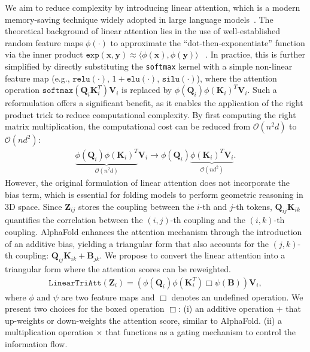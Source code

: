 We aim to reduce complexity by introducing linear attention, which is a modern memory-saving technique widely adopted in large language models~\cite{minimax2025minimax01scalingfoundationmodels,kimiteam2025kimilinearexpressiveefficient}. The theoretical background of linear attention lies in the use of well-established random feature maps $\phi(\cdot)$ to approximate the ``dot-then-exponentiate'' function via the inner product $\mathtt{exp}(\mathbf{x}, \mathbf{y})\approx\langle\phi(\mathbf{x}), \phi(\mathbf{y})\rangle$ ~\cite{rahimi2007random,peng2021randomfeatureattention}. In practice, this is further simplified by directly substituting the \texttt{softmax} kernel with a simple non-linear feature map (e.g., $\mathtt{relu(\cdot)}$, $1+\mathtt{elu(\cdot)}$, $\mathtt{silu}(\cdot)$), where the attention operation $\mathtt{softmax}(\mathbf{Q}_i\mathbf{K}_i^T)\mathbf{V}_i$ is replaced by $\phi(\mathbf{Q}_i)\phi(\mathbf{K}_i)^T\mathbf{V}_i$. Such a reformulation offers a significant benefit, as it enables the application of the right product trick to reduce computational complexity. By first computing the right matrix multiplication, the computational cost can be reduced from $\mathcal{O}(n^2d)$ to  $\mathcal{O}(nd^2)$:
\begin{align}
\underbrace{\phi(\mathbf{Q}_i)\phi(\mathbf{K}_i)^T}_{\mathcal{O}(n^2d)}\mathbf{V}_i
\rightarrow \phi(\mathbf{Q}_i)\underbrace{\phi(\mathbf{K}_i)^T\mathbf{V}_i}_{\mathcal{O}(nd^2)}.
\end{align}
However, the original formulation of linear attention does not incorporate the bias term, which is essential for folding models to perform geometric reasoning in 3D space. Since $\mathbf{Z}_{ij}$ stores the coupling between the $i$-th and $j$-th tokens, $\mathbf{Q}_{ij}\mathbf{K}_{ik}$ quantifies the correlation between the $(i,j)$-th coupling and the $(i,k)$-th coupling. AlphaFold enhances the attention mechanism through the introduction of an additive bias, yielding a triangular form that also accounts for the $(j,k)$-th coupling: $\mathbf{Q}_{ij}\mathbf{K}_{ik}+\mathbf{B}_{jk}$.
We propose to convert the linear attention into a triangular form where the attention scores can be reweighted.
\begin{align}
    \mathtt{LinearTriAtt}(\mathbf{Z}_i) = \left(\phi(\mathbf{Q}_i)\phi(\mathbf{K}_i^T)\Box\psi(\mathbf{B})\right)\mathbf{V}_i,
\end{align}
where $\phi$ and $\psi$ are two feature maps and $\Box$ denotes an undefined operation. We present two choices for the boxed operation $\Box$: (i) an additive operation $+$ that up-weights or down-weights the attention score, similar to AlphaFold. (ii) a multiplication operation $\times$ that functions as a gating mechanism to control the information flow.

